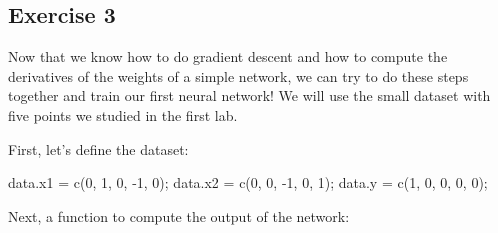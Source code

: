 \documentclass[
  a4paper,
]{article}
\newenvironment{Shaded}{\begin{snugshade}}{\end{snugshade}}
\newcommand{\DecValTok}[1]{\textcolor[rgb]{0.00,0.00,0.81}{#1}}
\newcommand{\FunctionTok}[1]{\textcolor[rgb]{0.00,0.00,0.00}{#1}}
\newcommand{\NormalTok}[1]{#1}
\newcommand{\OtherTok}[1]{\textcolor[rgb]{0.56,0.35,0.01}{#1}}
\newcommand{\SpecialCharTok}[1]{\textcolor[rgb]{0.00,0.00,0.00}{#1}}
\begin{document}
\hypertarget{exercise-3}{%
\subsection{Exercise 3}\label{exercise-3}}

Now that we know how to do gradient descent and how to compute the
derivatives of the weights of a simple network, we can try to do these
steps together and train our first neural network! We will use the small
dataset with five points we studied in the first lab.

First, let's define the dataset:

\begin{Shaded}
\begin{Highlighting}[]
\NormalTok{data.x1 }\OtherTok{=} \FunctionTok{c}\NormalTok{(}\DecValTok{0}\NormalTok{, }\DecValTok{1}\NormalTok{, }\DecValTok{0}\NormalTok{, }\SpecialCharTok{{-}}\DecValTok{1}\NormalTok{, }\DecValTok{0}\NormalTok{);}
\NormalTok{data.x2 }\OtherTok{=} \FunctionTok{c}\NormalTok{(}\DecValTok{0}\NormalTok{, }\DecValTok{0}\NormalTok{, }\SpecialCharTok{{-}}\DecValTok{1}\NormalTok{, }\DecValTok{0}\NormalTok{, }\DecValTok{1}\NormalTok{);}
\NormalTok{data.y }\OtherTok{=} \FunctionTok{c}\NormalTok{(}\DecValTok{1}\NormalTok{, }\DecValTok{0}\NormalTok{, }\DecValTok{0}\NormalTok{, }\DecValTok{0}\NormalTok{, }\DecValTok{0}\NormalTok{);}
\end{Highlighting}
\end{Shaded}

Next, a function to compute the output of the network:
\end{document}
